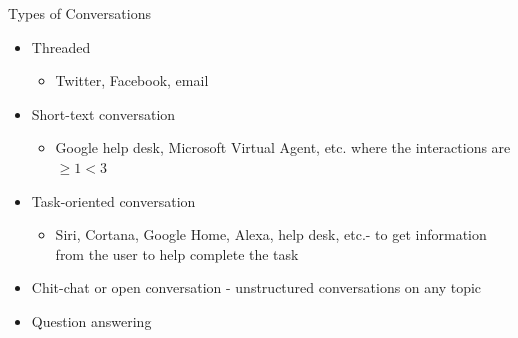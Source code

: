 \begin{frame}{Types of Conversations}
\begin{itemize}
	\item Threaded
	\begin{itemize}
		\item Twitter, Facebook, email
	\end{itemize}
	\item Short-text conversation
	\begin{itemize}
		\item Google help desk, Microsoft Virtual Agent, etc. where the interactions are $\ge 1 < 3$
	\end{itemize}
	\item Task-oriented conversation
	\begin{itemize}
		\item Siri, Cortana, Google Home, Alexa, help desk, etc.- to get information from the user to help complete the task
	\end{itemize}
	\item Chit-chat or open conversation - unstructured conversations on any topic
	\item Question answering
\end{itemize}
\end{frame}



